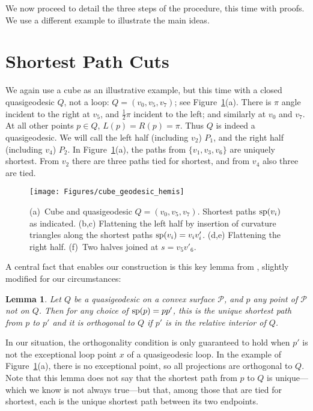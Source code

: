 \pdfoutput=1  \documentclass[]{article}
\newtheorem{lemma}[theorem]{Lemma}
\newcommand{\lemlab}[1]{\label{lemma:#1}}
\newcommand{\figlab}[1]{\label{fig:#1}}
\newcommand{\figref}[1]{\ref{fig:#1}}
\def\P{{\mathcal P}}
\def\sp{\mathop{\rm sp}\nolimits}
\begin{document}
We now proceed to detail the three steps of the procedure,
this time with proofs.  We use a different example
to illustrate the main ideas.

\section{Shortest Path Cuts}
We again use
a cube as an illustrative example, but this time with a 
closed quasigeodesic $Q$, not a loop: 
$Q=(v_0,v_5,v_7)$; see
Figure~\figref{cube_geodesic_hemis}(a).
There is $\pi$ angle incident to the right at $v_5$, 
and $\frac{1}{2}\pi$ incident to
the left; and similarly at $v_0$ and $v_7$.  At all other
points $p \in Q$, $L(p){=}R(p)=\pi$.  Thus $Q$ is indeed a quasigeodesic.
We will call the left half (including $v_2$) $P_1$, and the right half 
(including $v_4$) $P_2$.
In Figure~\figref{cube_geodesic_hemis}(a), the paths from $\{v_1,v_3,v_6\}$
are uniquely shortest.
From $v_2$ there are three paths tied for shortest, and from
$v_4$ also three are tied.
\begin{figure}[htbp]
\centering
\texttt{[image: Figures/cube\_geodesic\_hemis]}
\caption{
(a)~Cube and quasigeodesic $Q=(v_0,v_5,v_7)$. 
Shortest paths $\sp(v_i)$ as indicated.
(b,c) Flattening the left half  by insertion of curvature triangles
along the shortest paths $\sp(v_i)=v_iv'_i$.
(d,e) Flattening the right half.
(f)~Two halves joined at $s=v_5 v'_6$.
}
\figlab{cube_geodesic_hemis}
\end{figure}


A central fact that enables our construction is this key lemma from
\cite[Cor.~1]{iiv-qfpcs-07}, slightly modified for our circumstances:

\begin{lemma}                                                                   
Let $Q$ be a quasigeodesic on a convex surface $\P$, and $p$ any point of       
$\P$ not on $Q$.                                                                
Then for any choice of $\sp(p)=pp'$, this is the unique shortest path from      
$p$ to $p'$ and it is orthogonal to $Q$ if $p'$ is in the relative              
interior of $Q$.                                                                
\lemlab{IIV}                                                                    
\end{lemma}


In our situation, the orthogonality condition is only guaranteed
to hold when $p'$ is not the exceptional loop point $x$ of a quasigeodesic
loop.  In the example of Figure~\figref{cube_geodesic_hemis}(a),
there is no exceptional point, so all projections are orthogonal
to $Q$.
Note that this lemma does
not say that the shortest path from $p$ to $Q$ is unique---which we
know is not always true---but that,
among those that are tied for shortest, each is the unique shortest path
between its two endpoints.
\end{document}
